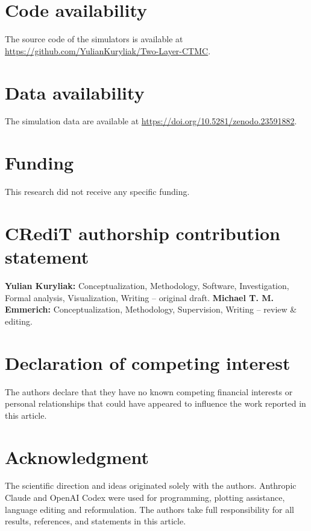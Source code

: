 \documentclass{ieeeaccess}
\newcommand{\michael}[2]{{\color{RoyalBlue}#1}}
\begin{document}
\section*{Code availability}
The source code of the simulators is available at
\url{https://github.com/YulianKuryliak/Two-Layer-CTMC}.

\section*{Data availability}
\michael{The simulation data are available at
\url{https://doi.org/10.5281/zenodo.23591882}.}{The data is available at
\url{10.5281/zenodo.23591882}.}

\section*{Funding}
This research did not receive any specific funding.

\section*{CRediT authorship contribution statement}

\textbf{Yulian Kuryliak:} Conceptualization, Methodology, Software,
Investigation, Formal analysis, Visualization, Writing -- original draft.
\textbf{Michael T. M. Emmerich:} Conceptualization, Methodology, Supervision,
Writing -- review \& editing.

\section*{Declaration of competing interest}
The authors declare that they have no known competing financial interests or
personal relationships that could have appeared to influence the work reported
in this article.

\section*{Acknowledgment}
\michael{The scientific direction and ideas originated solely with the authors. Anthropic Claude and OpenAI Codex were used for programming, plotting assistance, language editing and reformulation. The authors take full responsibility for all results, references, and     statements in this article.}{During the preparation of this manuscript, the first author used OpenAI ChatGPT and Codex, and Anthropic Claude to assist with drafting, language editing, and structuring the manuscript across Sections I–VIII and Appendices A–C. These tools were also used interactively to discuss and refine mathematical arguments, support experimental design and statistical analysis, and assist with the development of simulation and analysis code.

The authors directed the research, made the final scientific and methodological decisions, and reviewed and approved the resulting manuscript.}
\end{document}
